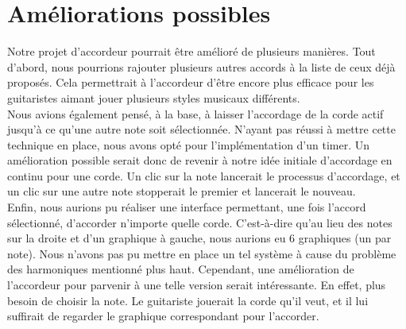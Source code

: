 \section{Améliorations possibles}
Notre projet d'accordeur pourrait être amélioré de plusieurs manières. Tout d'abord, nous pourrions rajouter plusieurs autres accords à la liste de ceux déjà proposés. Cela permettrait à l'accordeur d'être encore plus efficace pour les guitaristes aimant jouer plusieurs styles musicaux différents.\\

Nous avions également pensé, à la base, à laisser l'accordage de la corde actif jusqu'à ce qu'une autre note soit sélectionnée. N'ayant pas réussi à mettre cette technique en place, nous avons opté pour l'implémentation d'un timer. Un amélioration possible serait donc de revenir à notre idée initiale d'accordage en continu pour une corde. Un clic sur la note lancerait le processus d'accordage, et un clic sur une autre note stopperait le premier et lancerait le nouveau.\\

Enfin, nous aurions pu réaliser une interface permettant, une fois l'accord sélectionné, d'accorder n'importe quelle corde. C'est-à-dire qu'au lieu des notes sur la droite et d'un graphique à gauche, nous aurions eu 6 graphiques (un par note). Nous n'avons pas pu mettre en place un tel système à cause du problème des harmoniques mentionné plus haut. Cependant, une amélioration de l'accordeur pour parvenir à une telle version serait intéressante. En effet, plus besoin de choisir la note. Le guitariste jouerait la corde qu'il veut, et il lui suffirait de regarder le graphique correspondant pour l'accorder.